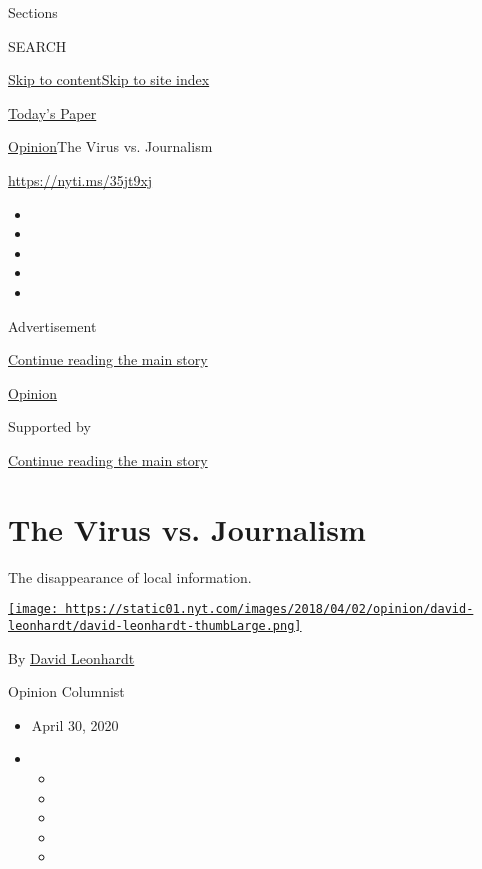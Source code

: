 Sections

SEARCH

\protect\hyperlink{site-content}{Skip to
content}\protect\hyperlink{site-index}{Skip to site index}

\href{https://myaccount.nytimes.com/auth/login?response_type=cookie\&client_id=vi}{}

\href{https://www.nytimes.com/section/todayspaper}{Today's Paper}

\href{/section/opinion}{Opinion}\textbar{}The Virus vs. Journalism

\href{https://nyti.ms/35jt9xj}{https://nyti.ms/35jt9xj}

\begin{itemize}
\item
\item
\item
\item
\item
\end{itemize}

Advertisement

\protect\hyperlink{after-top}{Continue reading the main story}

\href{/section/opinion}{Opinion}

Supported by

\protect\hyperlink{after-sponsor}{Continue reading the main story}

\hypertarget{the-virus-vs-journalism}{%
\section{The Virus vs. Journalism}\label{the-virus-vs-journalism}}

The disappearance of local information.

\href{https://www.nytimes.com/by/david-leonhardt}{\texttt{[image: https://static01.nyt.com/images/2018/04/02/opinion/david-leonhardt/david-leonhardt-thumbLarge.png]}}

By \href{https://www.nytimes.com/by/david-leonhardt}{David Leonhardt}

Opinion Columnist

\begin{itemize}
\item
  April 30, 2020
\item
  \begin{itemize}
  \item
  \item
  \item
  \item
  \item
  \end{itemize}
\end{itemize}

